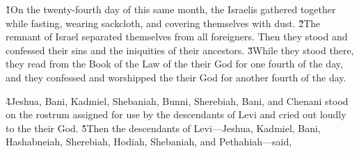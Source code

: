 \v{1}On the twenty-fourth day of this same month, the Israelis gathered together while fasting, wearing sackcloth, and covering themselves with dust. \v{2}The remnant of Israel separated themselves from all foreigners. Then they stood and confessed their sins and the iniquities of their ancestors. \v{3}While they stood there, they read from the Book of the Law of the  their God for one fourth of the day, and they confessed and worshipped the  their God for another fourth of the day.

\v{4}Jeshua, Bani, Kadmiel, Shebaniah, Bunni, Sherebiah, Bani, and Chenani stood on the rostrum assigned for use by the descendants of Levi and cried out loudly to the  their God. \v{5}Then the descendants of Levi---Jeshua, Kadmiel, Bani, Hashabneiah, Sherebiah, Hodiah, Shebaniah, and Pethahiah---said,

